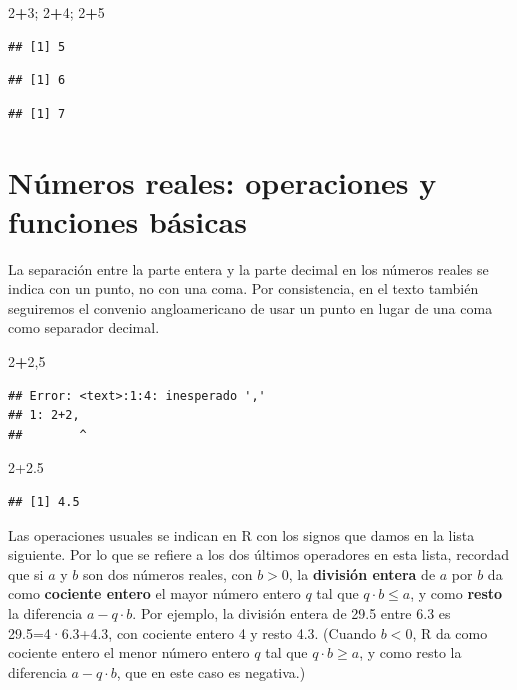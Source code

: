 \documentclass[]{book}
\newenvironment{Shaded}{\begin{snugshade}}{\end{snugshade}}
\newcommand{\DecValTok}[1]{\textcolor[rgb]{0.00,0.00,0.81}{#1}}
\newcommand{\FloatTok}[1]{\textcolor[rgb]{0.00,0.00,0.81}{#1}}
\newcommand{\NormalTok}[1]{#1}
\newcommand{\OperatorTok}[1]{\textcolor[rgb]{0.81,0.36,0.00}{\textbf{#1}}}
\theoremstyle{definition}
\theoremstyle{definition}
\theoremstyle{definition}
\theoremstyle{remark}
\begin{document}
\begin{Shaded}
\begin{Highlighting}[]
\DecValTok{2}\OperatorTok{+}\DecValTok{3}\NormalTok{; }\DecValTok{2}\OperatorTok{+}\DecValTok{4}\NormalTok{; }\DecValTok{2}\OperatorTok{+}\DecValTok{5}
\end{Highlighting}
\end{Shaded}

\begin{verbatim}
## [1] 5
\end{verbatim}

\begin{verbatim}
## [1] 6
\end{verbatim}

\begin{verbatim}
## [1] 7
\end{verbatim}

\hypertarget{numeros-reales-operaciones-y-funciones-basicas}{%
\section{Números reales: operaciones y funciones básicas}\label{numeros-reales-operaciones-y-funciones-basicas}}

La separación entre la parte entera y la parte decimal en los números reales se indica con un punto, no con una coma. Por consistencia, en el texto también seguiremos el convenio angloamericano de usar un punto en lugar de una coma como separador decimal.

\begin{Shaded}
\begin{Highlighting}[]
\DecValTok{2}\OperatorTok{+}\DecValTok{2}\NormalTok{,}\DecValTok{5}
\end{Highlighting}
\end{Shaded}

\begin{verbatim}
## Error: <text>:1:4: inesperado ','
## 1: 2+2,
##        ^
\end{verbatim}

\begin{Shaded}
\begin{Highlighting}[]
\DecValTok{2}\FloatTok{+2.5}
\end{Highlighting}
\end{Shaded}

\begin{verbatim}
## [1] 4.5
\end{verbatim}

Las operaciones usuales se indican en R con los signos que damos en la lista siguiente.
Por lo que se refiere a los dos últimos operadores en esta lista, recordad que si \(a\) y \(b\) son dos números reales, con \(b>0\), la \textbf{división entera} de \(a\) por \(b\) da como \textbf{cociente entero} el mayor número entero \(q\) tal que \(q\cdot b\leqslant a\), y como \textbf{resto}
la diferencia \(a-q\cdot b\). Por ejemplo, la división entera de 29.5 entre 6.3 es 29.5=4·6.3+4.3, con cociente entero 4 y resto 4.3. (Cuando \(b<0\), R da como cociente entero el menor número entero \(q\) tal que \(q\cdot b\geqslant a\), y como resto la diferencia \(a-q\cdot b\), que en este caso es negativa.)
\end{document}
